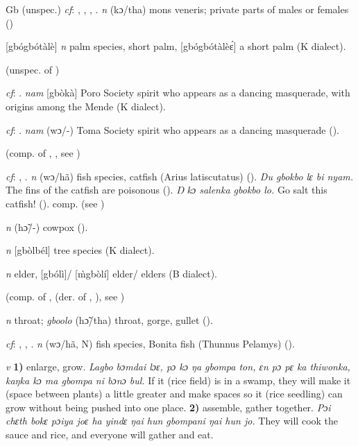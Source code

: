 \begin{letter}{Gb}
 (unspec.) \textit{cf}: , , , . \textit{n} (kɔ/tha) mons veneris; private parts of males or females (\citealt{Pichl1967})

 [gbógbótàlè] \textit{n} palm species, short palm, [gbógbótàlèɛ́] a short palm (K dialect).

 (unspec. of ) 

 \textit{cf}: . \textit{nam} [gbòkà] Poro Society spirit who appears as a dancing masquerade, with origins among the Mende (K dialect).

 \textit{cf}: . \textit{nam} (wɔ/-) Toma Society spirit who appears as a dancing masquerade (\citealt{Pichl1967}).

 (comp. of , , see ) 

 \textit{cf}: , . \textit{n} (wɔ/hã) fish species, catfish (Arius latiscutatus) (\citealt{Pichl1967}). \textit{Du gbokbo lɛ bi nyam.} The fins of the catfish are poisonous (\citealt{Pichl1967}). \textit{Ŋ kɔ salenka gbokbo lo.} Go salt this catfish! (\citealt{Pichl1967}). comp.  (see ) 

 \textit{n} (hɔ̃/-) cowpox (\citealt{Pichl1967}).

 \textit{n} [gbòlbél] tree species (K dialect). 

 \textit{n} elder, [gbólì]/ [\`{m}gbòlí] elder/ elders (B dialect).

 (comp. of ,  (der. of , ), see ) 

 \textit{n} throat; \textit{gboolo} (hɔ̃/tha) throat, gorge, gullet (\citealt{Pichl1967}).

 \textit{cf}: , , . \textit{n} (wɔ/hã, N) fish species, Bonita fish (Thunnus Pelamys) (\citealt{Pichl1967}).

 \textit{v} \textbf{1)} enlarge, grow. \textit{Lagbo bɔmdai lɔɛ, pɔ kɔ ŋa gbompa ton, ɛn pɔ pɛ ka thiwonka, kaŋka kɔ ma gbompa ni bɔnɔ bul.} If it (rice field) is in a swamp, they will make it (space between plants) a little greater and make spaces so it (rice seedling) can grow without being pushed into one place. \textbf{2)} assemble, gather together. \textit{Pɔi chɛth bokɛ pɔiya joɛ ha yindɛ ŋai hun gbompani ŋai hun jo.} They will cook the sauce and rice, and everyone will gather and eat.


\end{letter}
